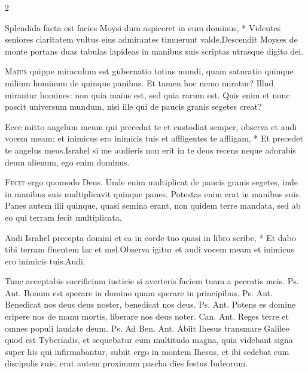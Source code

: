 \begin{multicols*}{2}
\begin{responsory}
{Splendida facta est facies Moysi dum aspiceret in eum dominus, * Videntes seniores claritatem vultus eius admirantes timuerunt valde.}{Descendit Moyses de monte portans duas tabulas lapideas in manibus suis scriptas utrasque digito dei.}
\end{responsory}%
\lettrine[lines=2]{\zallmancaps \color{Blue} M}{aius} quippe miraculum est gubernatio totius mundi, quam saturatio quinque milium hominum de quinque panibus. Et tamen hoc nemo miratur? Illud mirantur homines: non quia maius est, sed quia rarum est. Quis enim et nunc pascit universum mundum, nisi ille qui de paucis granis segetes creat?
\begin{responsory}
{Ecce mitto angelum meum qui precedat te et custodiat semper, observa et audi vocem meam: et inimicus ero inimicis tuis et affligentes te affligam, * Et precedet te angelus meus.}{Israhel si me audieris non erit in te deus recens neque adorabis deum alienum, ego enim dominus.}
\end{responsory}%
\lettrine[lines=2]{\zallmancaps \color{Red} F}{ecit} ergo quomodo Deus. Unde enim multiplicat de paucis granis segetes, inde in manibus suis multiplicavit quinque panes. Potestas enim erat in manibus suis. Panes autem illi quinque, quasi semina erant, non quidem terre mandata, sed ab eo qui terram fecit multiplicata.
\begin{responsory-doxology}
{Audi Israhel precepta domini et ea in corde tuo quasi in libro scribe, * Et dabo tibi terram fluentem lac et mel.}{Observa igitur et audi vocem meam et inimicus ero inimicis tuis.}Audi.
\end{responsory-doxology}%
 Tunc acceptabis sacrificium iusticie si averteris faciem tuam a peccatis meis. {\color{Red} Ps.}  {\color{Red} Ant.} Bonum est sperare in domino quam sperare in principibus. {\color{Red} Ps.}  {\color{Red} Ant.} Benedicat nos deus deus noster, benedicat nos deus. {\color{Red} Ps.}  {\color{Red} Ant.} Potens es domine eripere nos de manu mortis, liberare nos deus noter. {\color{Red} Can.}  {\color{Red} Ant.} Reges terre et omnes populi laudate deum. {\color{Red} Ps.}  {\color{Red} Ad Ben. Ant.} Abiit Ihesus transmare Galilee quod est Tyberiadis, et sequebatur eum multitudo magna, quia videbant signa super his qui infirmabantur, subiit ergo in montem Ihesus, et ibi sedebat cum discipulis suis, erat autem proximum pascha dies festus Iudeorum.

\end{multicols*}
